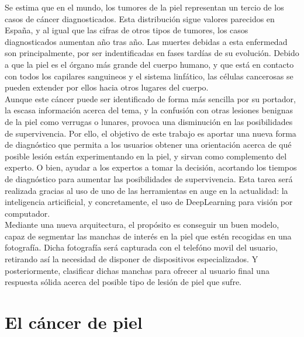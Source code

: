 Se estima que en el mundo, los tumores de la piel representan un tercio de los casos de cáncer diagnosticados. Esta distribución sigue valores parecidos en España, y al igual que las cifras de otros tipos de tumores, los casos diagnosticados aumentan año tras año. Las muertes debidas a esta enfermedad son principalmente, por ser indentificadas en fases tardías de su evolución. Debido a que la piel es el órgano más grande del cuerpo humano, y que está en contacto con todos los capilares sanguineos y el sistema linfático, las células cancerosas se pueden extender por ellos hacia otros lugares del cuerpo.\\

Aunque este cáncer puede ser identificado de forma más sencilla por su portador, la escasa información acerca del tema, y la confusión con otras lesiones benignas de la piel como verrugas o lunares, provoca una disminución en las posibilidades de supervivencia. Por ello, el objetivo de este trabajo es aportar una nueva forma de diagnóstico que permita a los usuarios obtener una orientación acerca de qué posible lesión están experimentando en la piel, y sirvan como complemento del experto. O bien, ayudar a los expertos a tomar la decisión, acortando los tiempos de diagnóstico para aumentar las posibilidades de supervivencia. Esta tarea será realizada gracias al uso de uno de las herramientas en auge en la actualidad: la inteligencia articificial, y concretamente, el uso de DeepLearning para visión por computador.\\
 
 Mediante una nueva arquitectura, el propósito es conseguir un buen modelo, capaz de segmentar las manchas de interés en la piel que estén recogidas en una fotografía. Dicha fotografía será capturada con el telefóno movil del usuario, retirando así la necesidad de disponer de dispositivos especializados. Y posteriormente, clasificar dichas manchas para ofrecer al usuario final una respuesta sólida acerca del posible tipo de lesión de piel que sufre.\\

\newpage
\section{El cáncer de piel}

